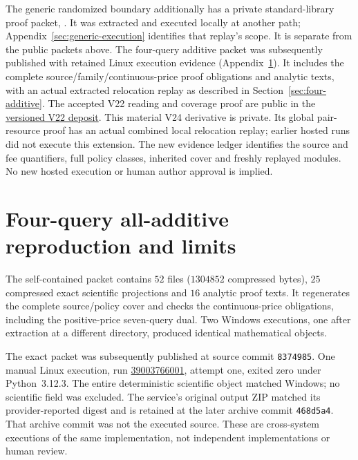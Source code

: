 \documentclass[pdflatex,sn-mathphys-num]{sn-jnl}
\theoremstyle{thmstyleone}
\theoremstyle{thmstylethree}
\theoremstyle{thmstyletwo}
\begin{document}
The generic randomized boundary additionally has a private standard-library proof packet, . It was extracted and executed locally at another path; Appendix~\ref{sec:generic-execution} identifies that replay's scope. It is separate from the public packets above. The four-query additive packet  was subsequently published with retained Linux execution evidence (Appendix~\ref{app:four-additive-replay}). It includes the complete source/family/continuous-price proof obligations and analytic texts, with an actual extracted relocation replay as described in Section~\ref{sec:four-additive}. The accepted V22 reading and coverage proof are public in the
\href{https://github.com/SHiJiE1115/newproj/tree/5df6889dca8928d6a676da980e6ceb9b2ba515d3/manuscript/journal_v22_reading}{versioned V22 deposit}.
This material V24 derivative is private. Its global pair-resource
proof has an actual combined local relocation replay; earlier hosted
runs did not execute this extension. The new evidence ledger identifies
the source and fee quantifiers, full policy classes, inherited cover
and freshly replayed modules. No new hosted execution or human author
approval is implied.

\section{Four-query all-additive reproduction and limits}
\label{app:four-additive-replay}
The self-contained packet  contains $52$
files ($1304852$ compressed bytes), $25$ compressed exact scientific
projections and $16$ analytic proof texts. It regenerates the complete
source/policy cover and checks the continuous-price obligations, including
the positive-price seven-query dual. Two Windows executions, one after
extraction at a different directory, produced identical mathematical objects.

The exact packet was subsequently published at source commit
\texttt{8374985}. One manual Linux execution, run
\href{https://github.com/SHiJiE1115/newproj/actions/runs/39003766001}{39003766001},
attempt one, exited zero under Python~3.12.3. The entire deterministic
scientific object matched Windows; no scientific field was excluded.
The service's original output ZIP matched its provider-reported digest
and is retained at the later archive commit \texttt{468d5a4}. That archive
commit was not the executed source. These are cross-system executions
of the same implementation, not independent implementations or human review.
\end{document}

